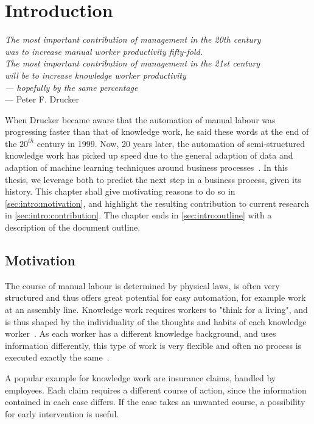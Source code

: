 \chapter{Introduction}\label{sec:intro}
\begin{flushright}{\slshape    
The most important contribution of management in the 20th century\\
was to increase manual worker productivity fifty-fold.\\
The most important contribution of management in the 21st century\\
will be to increase knowledge worker productivity\\
— hopefully by the same percentage} \\ \medskip
--- Peter F. Drucker~\cite{drucker1999}
\end{flushright}

When Drucker became aware that the automation of manual labour was progressing faster than that of knowledge work, he said these words at the end of the $20^{th}$ century in 1999. Now, 20 years later, the automation of semi-structured knowledge work has picked up speed due to the general adaption of data and adaption of machine learning techniques around business processes~\cite{boehmer2018probability, klinkmuller2018reliablemonitoring}.
In this thesis, we leverage both to predict the next step in a business process, given its history. This chapter shall give motivating reasons to do so in \autoref{sec:intro:motivation}, and highlight the resulting contribution to current research in \autoref{sec:intro:contribution}. The chapter ends in \autoref{sec:intro:outline} with a description of the document outline.

\section{Motivation} \label{sec:intro:motivation}
The course of manual labour is determined by physical laws, is often very structured and thus offers great potential for easy automation, for example work at an assembly line. Knowledge work requires workers to "think for a living", and is thus shaped by the individuality of the thoughts and habits of each knowledge worker~\cite{drucker1999}. As each worker has a different knowledge background, and uses information differently, this type of work is very flexible and often no process is executed exactly the same~\cite{hewelt2016}.

A popular example for knowledge work are insurance claims, handled by employees. Each claim requires a different course of action, since the information contained in each case differs. If the case takes an unwanted course, a possibility for early intervention is useful.\\

